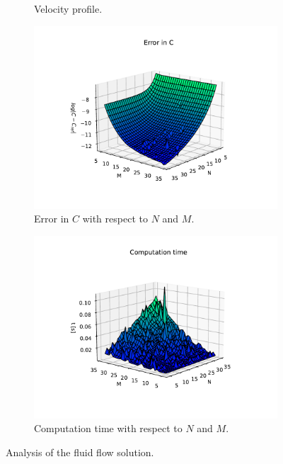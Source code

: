 \documentclass[12pt, a4paper]{article}
\begin{document}
\begin{figure}[hbtp]
\begin{subfigure}{0.5\textwidth}
  \caption{Velocity profile.} \label{fig:b}
  \end{subfigure}
  \medskip
  \begin{subfigure}{0.5\textwidth}
  \includegraphics[width=\linewidth]{../graphs/error_in_c.pdf}
  \caption{Error in $C$ with respect to $N$ and $M$.} \label{fig:c}
  \end{subfigure}
  \hspace*{\fill}
  \begin{subfigure}{0.5\textwidth}
  \includegraphics[width=\linewidth]{../graphs/time.pdf}
  \caption{Computation time with respect to $N$ and $M$.} \label{fig:d}
  \end{subfigure} 
  \caption{Analysis of the fluid flow solution.} \label{fig:1}
\end{figure}
\end{document}
